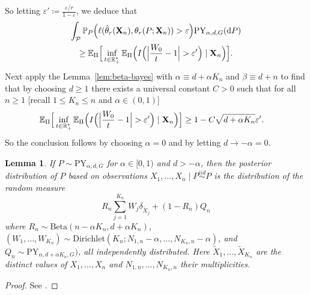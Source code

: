 \documentclass{article}
\newtheorem{lemma}{Lemma}
\newcommand{\1}{\boldsymbol{1}}
\newcommand{\EE}{\mathbb{E}}
\newcommand{\PP}{\mathbb{P}}
\newcommand{\distiid}{\overset{iid}{\sim}}
\theoremstyle{plain}
\begin{document}
So letting $\varepsilon' \coloneqq \frac{\varepsilon/r}{1-\varepsilon}$, we deduce that
\begin{multline*}
  \int_{\mathcal{P}}\PP_P\Big(\ell(\hat{\theta}_r(\mathbf{X}_n),\theta_r(P;\mathbf{X}_n)) > \varepsilon \Big) \mathrm{PY}_{\alpha,d,G}(\intd P)\\%
\geq \EE_{\Pi}\Big[ \inf_{t\in \NNReals^{*}}\EE_{\Pi}\Big(I\Big( \Big| \frac{W_0}{t} - 1\Big| > \varepsilon'  \Big) \mid \mathbf{X}_n\Big) \Big].
\end{multline*}
Next apply the Lemma~\ref{lem:beta-bayes} with $\alpha \equiv d + \alpha K_n$ and $\beta \equiv d+n$ to find that by choosing $d \geq 1$ there exists a universal constant $C > 0$ such that for all $n\geq 1$ [recall $1 \leq K_n \leq n$ and $\alpha \in (0,1)$]
\begin{align}
  \label{eq:9ab}
  \EE_{\Pi}\Big[ \inf_{t\in \NNReals^{*}}\EE_{\Pi}\Big(I\Big( \Big| \frac{W_0}{t} - 1\Big| > \varepsilon'  \Big) \mid \mathbf{X}_n\Big) \Big]
  &\geq 1 - C \sqrt{d + \alpha K_n}\varepsilon'. 
\end{align}
So the conclusion follows by choosing $\alpha = 0$ and by letting $d \to -\alpha = 0$.

\begin{lemma}
  \label{lem:4}
  If $P \sim \mathrm{PY}_{\alpha,d,G}$ for $\alpha \in [0,1)$ and $d > -\alpha$, then the posterior distribution of $P$ based on observations $X_1,\dots,X_n \mid P \distiid P$ is the distribution of the random measure
  \begin{equation*}
    R_n\sum_{j=1}^{K_n}W_j\delta_{\tilde{X}_j} + (1 - R_n)Q_n
  \end{equation*}
  where $R_n \sim \mathrm{Beta}(n - \alpha K_n, d + \alpha K_n)$, $(W_1,\dots,W_{K_n}) \sim \mathrm{Dirichlet}(K_n;N_{1,n} - \alpha,\dots,N_{K_n,n}-\alpha)$, and $Q_n \sim \mathrm{PY}_{\alpha,d + \alpha K_n,G})$, all independently distributed. Here $\tilde{X}_1,\dots,\tilde{X}_{K_n}$ are the distinct values of $X_1,\dots,X_n$ and $N_{1,n},\dots,N_{K_n,n}$ their multiplicities.
\end{lemma}
\begin{proof}
  See \cite[Theorem~14.37]{Gho(17)}.
\end{proof}
\end{document}
